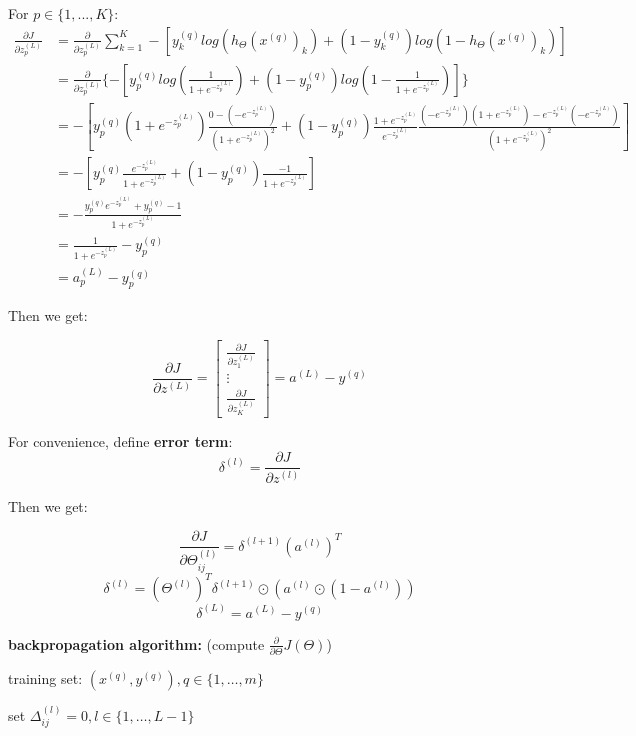 \documentclass{article}
\begin{document}
\noindent For \(p \in \{1, ..., K\}\):
\begin{equation*}
\begin{split}
\frac{\partial J}{\partial z_p^{(L)}} 
& = \frac{\partial}{\partial z_p^{(L)}} \sum_{k = 1}^{K} -[y^{(q)}_k log(h_{\Theta} (x^{(q)})_k) + (1 - y^{(q)}_k) log(1 - h_{\Theta}(x^{(q)})_k)] \\
& = \frac{\partial}{\partial z_p^{(L)}} \{-[y^{(q)}_p log(\frac{1}{1 + e^{-z_p^{(L)}}}) + (1 - y^{(q)}_p) log(1 - \frac{1}{1 + e^{-z_p^{(L)}}})]\} \\
& = - [y^{(q)}_p (1 + e^{-z_p^{(L)}}) \frac{0 - (-e^{-z_p^{(L)}})}{(1 + e^{-z_p^{(L)}})^2} + (1 - y^{(q)}_p) \frac{1 + e^{-z_p^{(L)}}}{e^{-z_p^{(L)}}} \frac{(-e^{-z_p^{(L)}})(1 + e^{-z_p^{(L)}}) - e^{-z_p^{(L)}}(-e^{-z_p^{(L)}})}{(1 + e^{-z_p^{(L)}})^2}] \\
& = - [y_p^{(q)} \frac{e^{-z_p^{(L)}}}{1 + e^{-z_p^{(L)}}} + (1 - y_p^{(q)}) \frac{-1}{1 + e^{-z_p^{(L)}}}] \\
& = - \frac{y_p^{(q)}e^{-z_p^{(L)}} + y_p^{(q)} - 1}{1 + e^{-z_p^{(L)}}} \\
& = \frac{1}{1 + e^{-z_p^{(L)}}} - y_p^{(q)} \\ 
& = a_p^{(L)} - y_p^{(q)}
\end{split}
\end{equation*}

\noindent Then we get:

\[\frac{\partial J}{\partial z^{(L)}} = 
\begin{bmatrix}
\frac{\partial J}{\partial z_1^{(L)}} \\
\vdots \\
\frac{\partial J}{\partial z_K^{(L)}}
\end{bmatrix}
= a^{(L)} - y^{(q)}
\]

\noindent For convenience, define \textbf{error term}: 
\[\delta^{(l)} = \frac{\partial J}{\partial z^{(l)}}\]

\noindent Then we get:

\[\frac{\partial J}{\partial \Theta_{ij}^{(l)}} = \delta^{(l + 1)} (a^{(l)})^T\]
\[\delta^{(l)} = (\Theta^{(l)})^T \delta^{(l + 1)} \odot (a^{(l)} \odot (1 - a^{(l)}))\]
\[\delta^{(L)} = a^{(L)} - y^{(q)}\]

\noindent \textbf{backpropagation algorithm:} (compute \(\frac{\partial}{\partial \Theta} J(\Theta)\))

\noindent training set: \((x^{(q)}, y^{(q)}), q \in \{1, \dots, m\}\)

\noindent set \(\Delta_{ij}^{(l)} = 0, l \in \{1, \dots, L - 1\}\)
\end{document}
